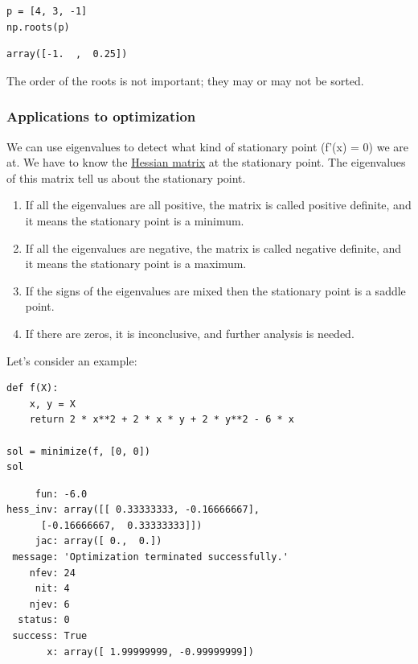 \documentclass[11pt]{article}
\begin{document}
\begin{verbatim}
p = [4, 3, -1]
np.roots(p)
\end{verbatim}

\begin{verbatim}
array([-1.  ,  0.25])
\end{verbatim}

The order of the roots is not important; they may or may not be sorted.

\subsubsection{Applications to optimization}
\label{sec:org3d30925}

We can use eigenvalues to detect what kind of stationary point (f'(x) = 0) we are at. We have to know the \href{https://en.wikipedia.org/wiki/Hessian\_matrix}{Hessian matrix} at the stationary point. The eigenvalues of this matrix tell us about the stationary point.

\begin{enumerate}
\item If all the eigenvalues are all positive, the matrix is called positive definite, and it means the stationary point is a minimum.
\item If all the eigenvalues are negative, the matrix is called negative definite, and it means the stationary point is a maximum.
\item If the signs of the eigenvalues are mixed then the stationary point is a saddle point.
\item If there are zeros, it is inconclusive, and further analysis is needed.
\end{enumerate}

Let's consider an example:

\begin{verbatim}
def f(X):
    x, y = X
    return 2 * x**2 + 2 * x * y + 2 * y**2 - 6 * x

sol = minimize(f, [0, 0])
sol
\end{verbatim}

\begin{verbatim}
     fun: -6.0
hess_inv: array([[ 0.33333333, -0.16666667],
      [-0.16666667,  0.33333333]])
     jac: array([ 0.,  0.])
 message: 'Optimization terminated successfully.'
    nfev: 24
     nit: 4
    njev: 6
  status: 0
 success: True
       x: array([ 1.99999999, -0.99999999])
\end{verbatim}
\end{document}
